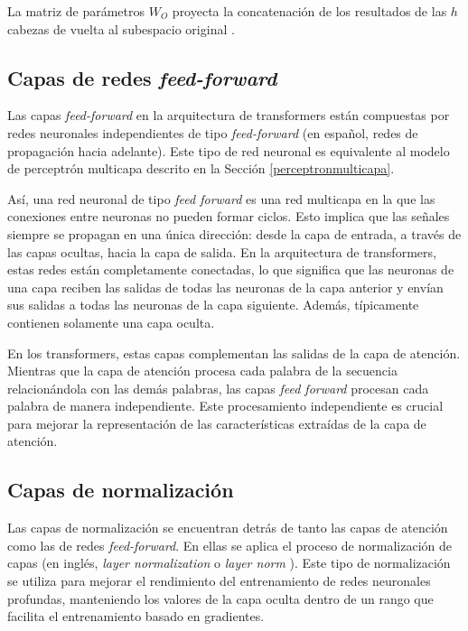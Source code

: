 \documentclass[11pt,spanish,listoffigures,listoftables]{tfgetsinf}
\begin{document}
La matriz de parámetros $W_O$ proyecta la concatenación de los resultados de las $h$ cabezas de vuelta al subespacio original \cite{cordonnier2021multiheadattentioncollaborateinstead, multiheaddotproduct, jurafsky2023speech}.

\subsection{Capas de redes \textit{feed-forward}}

Las capas \textit{feed-forward} en la arquitectura de transformers están compuestas por redes neuronales independientes de tipo \textit{feed-forward} (en español, redes de propagación hacia adelante). Este tipo de red neuronal es equivalente al modelo de perceptrón multicapa descrito en la Sección  \ref{perceptronmulticapa}.

Así, una red neuronal de tipo \textit{feed forward} es una red multicapa en la que las conexiones entre neuronas no pueden formar ciclos. Esto implica que las señales siempre se propagan en una única dirección: desde la capa de entrada, a través de las capas ocultas, hacia la capa de salida. En la arquitectura de transformers, estas redes están completamente conectadas, lo que significa que las neuronas de una capa reciben las salidas de todas las neuronas de la capa anterior y envían sus salidas a todas las neuronas de la capa siguiente. Además, típicamente contienen solamente una capa oculta.

En los transformers, estas capas complementan las salidas de la capa de atención. Mientras que la capa de atención procesa cada palabra de la secuencia relacionándola con las demás palabras, las capas \textit{feed forward} procesan cada palabra de manera independiente. Este procesamiento independiente es crucial para mejorar la representación de las características extraídas de la capa de atención.

\subsection{Capas de normalización}

Las capas de normalización se encuentran detrás de tanto las capas de atención como las de redes \textit{feed-forward}. En ellas se aplica el proceso de normalización de capas (en inglés, \textit{layer normalization} o \textit{layer norm} \cite{ba2016layernormalization}). Este tipo de normalización se utiliza para mejorar el rendimiento del entrenamiento de redes neuronales profundas, manteniendo los valores de la capa oculta dentro de un rango que facilita el entrenamiento basado en gradientes.
\end{document}
